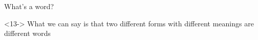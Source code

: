 \documentclass{beamer}
\newcommand{\subtwoone}{What's a word?}
\begin{document}
\begin{frame}[t]{\subtwoone}
{\begin{block}
          \end{block}
          \begin{alertblock}<13->{}
            What we can say is that two different forms with different meanings are different words
          \end{alertblock}
        }
      \end{frame}
\end{document}
